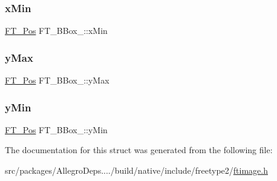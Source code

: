 \subsubsection{\texorpdfstring{x\+Min}{xMin}}
{\footnotesize\ttfamily \hyperlink{ftimage_8h_af5f230f4b253d4c7715fd2e595614c90}{F\+T\+\_\+\+Pos} F\+T\+\_\+\+B\+Box\+\_\+\+::x\+Min}

\mbox{\label{struct_f_t___b_box___a77084921589f386a8a593ae1f25b1569}} 
\subsubsection{\texorpdfstring{y\+Max}{yMax}}
{\footnotesize\ttfamily \hyperlink{ftimage_8h_af5f230f4b253d4c7715fd2e595614c90}{F\+T\+\_\+\+Pos} F\+T\+\_\+\+B\+Box\+\_\+\+::y\+Max}

\mbox{\label{struct_f_t___b_box___a959ca1d5bc1c5338da0d85c8e7135f4e}} 
\subsubsection{\texorpdfstring{y\+Min}{yMin}}
{\footnotesize\ttfamily \hyperlink{ftimage_8h_af5f230f4b253d4c7715fd2e595614c90}{F\+T\+\_\+\+Pos} F\+T\+\_\+\+B\+Box\+\_\+\+::y\+Min}



The documentation for this struct was generated from the following file\+:\begin{DoxyCompactItemize}
\item 
src/packages/\+Allegro\+Deps..../build/native/include/freetype2/\hyperlink{ftimage_8h}{ftimage.\+h}\end{DoxyCompactItemize}

